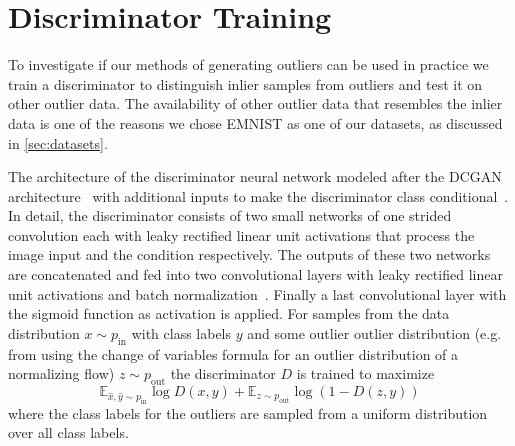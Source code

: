 \section{Discriminator Training}%
\label{sec:discriminator_training}

To investigate if our methods of generating outliers can be used in practice we
train a discriminator to distinguish inlier samples from outliers and test it
on other outlier data. The availability of other outlier data that resembles
the inlier data is one of the reasons we chose EMNIST as one of our datasets,
as discussed in \autoref{sec:datasets}.

The architecture of the discriminator neural network modeled after the
DCGAN architecture~\citep{radfordUnsupervisedRepresentationLearning2016} with
additional inputs to make the discriminator class
conditional~\citep{mirzaConditionalGenerativeAdversarial2014}. In detail, the
discriminator consists of two small networks of one strided convolution each
with leaky rectified linear unit activations that process the image input and
the condition respectively. The outputs of these two networks are concatenated
and fed into two convolutional layers with leaky rectified linear unit
activations and batch
normalization~\citep{ioffeBatchNormalizationAccelerating2015}. Finally a last
convolutional layer with the sigmoid function as activation is applied.
For samples from the data distribution $x \sim p_{\mathrm{in}}$ with class
labels $y$ and some outlier outlier distribution (e.g. from using the change of variables formula
for an outlier distribution of a normalizing flow) $z \sim p_{\mathrm{out}}$
the discriminator $D$ is trained to maximize
\begin{equation}
	\mathbb{E}_{\hat{x}, \hat{y} \sim p_{\mathrm{in}}} \log D(x, y) +
	\mathbb{E}_{z \sim p_{\mathrm{out}}} \log ( 1 - D(z, y) )
\end{equation}
where the class labels for the outliers are sampled from a uniform distribution
over all class labels.

